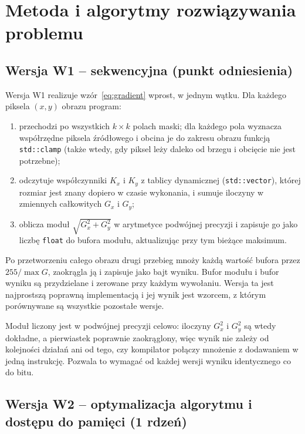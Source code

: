 \documentclass[12pt,a4paper]{article}
\newcommand{\kod}[1]{\texttt{#1}}
\begin{document}
\section{Metoda i algorytmy rozwiązywania problemu}

\subsection{Wersja W1 -- sekwencyjna (punkt odniesienia)}

Wersja W1 realizuje wzór~\eqref{eq:gradient} wprost, w jednym wątku. Dla każdego piksela $(x, y)$ obrazu program:
\begin{enumerate}
	\item przechodzi po wszystkich $k \times k$ polach maski; dla każdego pola wyznacza współrzędne piksela źródłowego i obcina je do zakresu obrazu funkcją \kod{std::clamp} (także wtedy, gdy piksel leży daleko od brzegu i obcięcie nie jest potrzebne);
	\item odczytuje współczynniki $K_x$ i $K_y$ z tablicy dynamicznej (\kod{std::vector}), której rozmiar jest znany dopiero w czasie wykonania, i sumuje iloczyny w zmiennych całkowitych $G_x$ i $G_y$;
	\item oblicza moduł $\sqrt{G_x^2 + G_y^2}$ w arytmetyce podwójnej precyzji i zapisuje go jako liczbę \kod{float} do bufora modułu, aktualizując przy tym bieżące maksimum.
\end{enumerate}
Po przetworzeniu całego obrazu drugi przebieg mnoży każdą wartość bufora przez $255/\max G$, zaokrągla ją i zapisuje jako bajt wyniku. Bufor modułu i bufor wyniku są przydzielane i zerowane przy każdym wywołaniu. Wersja ta jest najprostszą poprawną implementacją i jej wynik jest wzorcem, z którym porównywane są wszystkie pozostałe wersje.

Moduł liczony jest w podwójnej precyzji celowo: iloczyny $G_x^2$ i $G_y^2$ są wtedy dokładne, a pierwiastek poprawnie zaokrąglony, więc wynik nie zależy od kolejności działań ani od tego, czy kompilator połączy mnożenie z dodawaniem w jedną instrukcję. Pozwala to wymagać od każdej wersji wyniku identycznego co do bitu.

\subsection{Wersja W2 -- optymalizacja algorytmu i dostępu do pamięci (1 rdzeń)}
\end{document}
